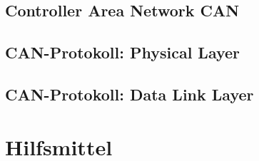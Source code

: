 \subsection{Controller Area Network CAN} \label{subsec:CAN}
\lipsum[1-1]
\subsection{CAN-Protokoll: Physical Layer} \label{subsec:PhysicalLayer}
\lipsum[1-1]
\subsection{CAN-Protokoll: Data Link Layer} \label{subsec:DataLinkLayer}
\lipsum[1-1]

\section{Hilfsmittel} \label{sec:Hilfsmittel} %


